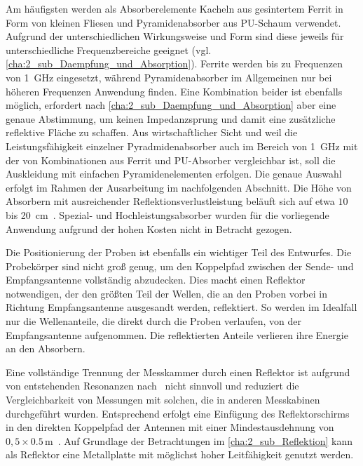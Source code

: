 \par
\vspace{\linespace}
Am häufigsten werden als Absorberelemente Kacheln aus gesintertem Ferrit in Form von kleinen Fliesen und Pyramidenabsorber aus PU-Schaum verwendet. Aufgrund der unterschiedlichen Wirkungsweise und Form sind diese jeweils für unterschiedliche Frequenzbereiche geeignet (vgl. \Abschnitt\ref{cha:2_sub_Daempfung_und_Absorption}). Ferrite werden bis zu Frequenzen von \SI{1}{\giga\hertz} eingesetzt, während Pyramidenabsorber im Allgemeinen nur bei höheren Frequenzen Anwendung finden. Eine Kombination beider ist ebenfalls möglich, erfordert nach \Abschnitt\ref{cha:2_sub_Daempfung_und_Absorption} aber eine genaue Abstimmung, um keinen Impedanzsprung und damit eine zusätzliche reflektive Fläche zu schaffen. Aus wirtschaftlicher Sicht und weil die Leistungsfähigkeit einzelner Pyradmidenabsorber auch im Bereich von \SI{1}{\giga\hertz} mit der von Kombinationen aus Ferrit und PU-Absorber vergleichbar ist, soll die Auskleidung mit einfachen Pyramidenelementen erfolgen. Die genaue Auswahl erfolgt im Rahmen der Ausarbeitung im nachfolgenden Abschnitt. Die Höhe von Absorbern mit ausreichender Reflektionsverlustleistung beläuft sich auf etwa $10$ bis \SI{20}{\centi\meter}~\cite{Holland_Shielding_Absorber, Telemeter_Produktseite, Eco_Messtechnik_Absorber}. Spezial- und Hochleistungsabsorber wurden für die vorliegende Anwendung aufgrund der hohen Kosten nicht in Betracht gezogen. 
\par
\vspace{\linespace} 
Die Positionierung der Proben ist ebenfalls ein wichtiger Teil des Entwurfes. Die Probekörper sind nicht groß genug, um den Koppelpfad zwischen der Sende- und Empfangsantenne vollständig abzudecken. Dies macht einen Reflektor notwendigen, der den größten Teil der Wellen, die an den Proben vorbei in Richtung Empfangsantenne ausgesandt werden, reflektiert. So werden im Idealfall nur die Wellenanteile, die direkt durch die Proben verlaufen, von der Empfangsantenne aufgenommen. Die reflektierten Anteile verlieren ihre Energie an den Absorbern.   
\par
\vspace{\linespace}
Eine vollständige Trennung der Messkammer durch einen Reflektor ist aufgrund von entstehenden Resonanzen nach~\cite{Techniques_Shielding_Effectiveness_Far_Field_Simulation} nicht sinnvoll und reduziert die Vergleichbarkeit von Messungen mit solchen, die in anderen Messkabinen durchgeführt wurden. Entsprechend erfolgt eine Einfügung des Reflektorschirms in den direkten Koppelpfad der Antennen mit einer Mindestausdehnung von $0,5 \times 0.5\,\si{\meter}$~\cite{DIN_EN_61000-4-3}. Auf Grundlage der Betrachtungen im \Abschnitt\ref{cha:2_sub_Reflektion} kann als Reflektor eine Metallplatte mit möglichst hoher Leitfähigkeit genutzt werden.
